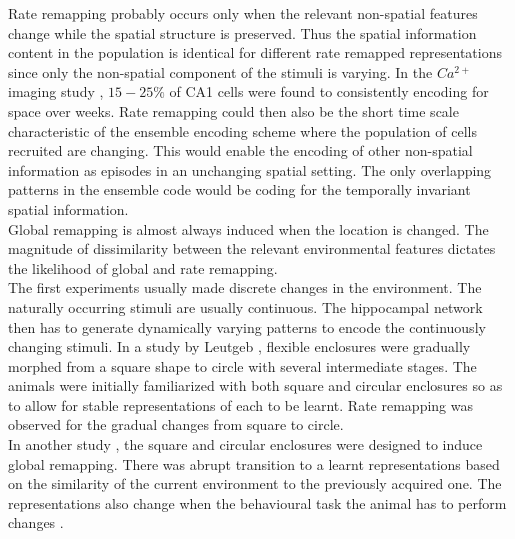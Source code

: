 Rate remapping probably occurs only when the relevant non-spatial features change while the spatial structure is preserved. Thus the spatial information content in the population is identical for different rate remapped representations since only the non-spatial component of the stimuli is varying. In the $Ca^{2+}$ imaging study \cite{Ziv2013}, $15-25 \% $ of CA1 cells were found to consistently encoding for space over weeks. Rate remapping could then also be the short time scale characteristic of the ensemble encoding scheme where the population of cells recruited are changing. This would enable the encoding of other non-spatial information as episodes in an unchanging spatial setting. The only overlapping patterns in the ensemble code would be coding for the temporally invariant spatial information. \\
Global remapping is almost always induced when the location is changed. The magnitude of dissimilarity between the relevant environmental features dictates the likelihood of global and rate remapping. \\
The first experiments usually made discrete changes in the environment. The naturally occurring stimuli are usually continuous. The hippocampal network then has to generate dynamically varying patterns to encode the continuously changing stimuli. In a study by Leutgeb \cite{Leutgeb2005}, flexible enclosures were gradually morphed from a square shape to circle with several intermediate stages. The animals were initially familiarized with both square and circular enclosures so as to allow for stable representations of each to be learnt. Rate remapping was observed for the gradual changes from square to circle. \\
In another study \cite{Wills2005}, the square and circular enclosures were designed to induce global remapping. There was abrupt transition to a learnt representations based on the similarity of the current environment to the previously acquired one. The representations also change when the behavioural task the animal has to perform changes \cite{Markus1995}. \\
